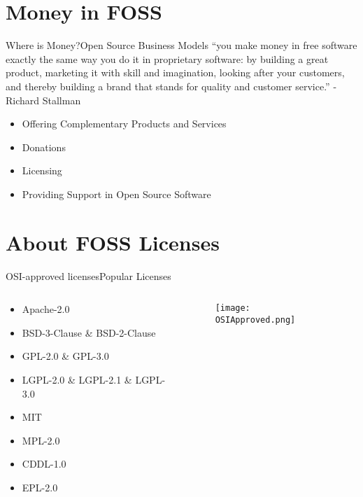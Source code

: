 \documentclass{beamer}
\begin{document}
    \section{Money in FOSS}
    \begin{frame}{Where is Money?}{Open Source Business Models}
        “you make money in free software exactly the same way you do it in proprietary software:
        by building a great product, marketing it with skill and imagination, looking after your customers, and
        thereby building a brand that stands for quality and customer service.” - Richard Stallman\cite{bretthauer2001open}
        \\[10pt]
        \begin{itemize}
            \item Offering Complementary Products and Services\cite{hall2016open}
            \item Donations\cite{make-money-oss}
            \item Licensing\cite{make-money-oss}
            \item Providing Support in Open Source Software\cite{make-money-oss}
        \end{itemize}
    \end{frame}

    \section{About FOSS Licenses}
    \begin{frame}{OSI-approved licenses\cite{OSIWEBSITE:6}}{Popular Licenses}
        \begin{columns}
            \begin{column}{0.5\textwidth}
                \begin{itemize}
                    \item Apache-2.0
                    \item BSD-3-Clause \& BSD-2-Clause
                    \item GPL-2.0 \& GPL-3.0
                    \item LGPL-2.0 \& LGPL-2.1 \& LGPL-3.0
                    \item MIT
                    \item MPL-2.0
                    \item CDDL-1.0
                    \item EPL-2.0
                \end{itemize}
            \end{column}
            \begin{column}{0.5\textwidth}
                \begin{figure}
                    \centering
                    \texttt{[image: OSIApproved.png]}
                    \caption{\cite{OSIWEBSITE:6}}
                \end{figure}
            \end{column}
        \end{columns}
    \end{frame}
\end{document}
